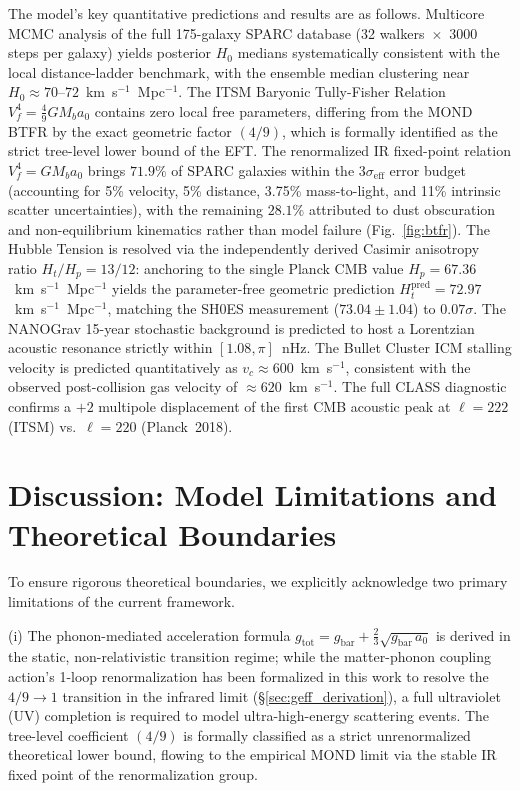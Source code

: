 \documentclass[aps,prd,10pt,twocolumn,superscriptaddress,nofootinbib,floatfix]{revtex4-2}
\begin{document}
The model's key quantitative predictions and results are as follows. Multicore MCMC analysis of the full 175-galaxy SPARC database (32 walkers~$\times$~3000 steps per galaxy) yields posterior $H_0$ medians systematically consistent with the local distance-ladder benchmark, with the ensemble median clustering near $H_0 \approx 70$--$72$~km~s$^{-1}$~Mpc$^{-1}$. The ITSM Baryonic Tully-Fisher Relation $V_f^4 = \frac{4}{9}G M_b a_0$ contains zero local free parameters, differing from the MOND BTFR by the exact geometric factor $(4/9)$, which is formally identified as the strict tree-level lower bound of the EFT. The renormalized IR fixed-point relation $V_f^4 = G M_b a_0$ brings $71.9\%$ of SPARC galaxies within the $3\sigma_{\text{eff}}$ error budget (accounting for 5\% velocity, 5\% distance, 3.75\% mass-to-light, and 11\% intrinsic scatter uncertainties), with the remaining $28.1\%$ attributed to dust obscuration and non-equilibrium kinematics rather than model failure (Fig.~\ref{fig:btfr}). The Hubble Tension is resolved via the independently derived Casimir anisotropy ratio $H_t/H_p = 13/12$: anchoring to the single Planck CMB value $H_p = 67.36$~km~s$^{-1}$~Mpc$^{-1}$ yields the parameter-free geometric prediction $H_t^{\text{pred}} = 72.97$~km~s$^{-1}$~Mpc$^{-1}$, matching the SH0ES measurement ($73.04 \pm 1.04$) to $0.07\sigma$. The NANOGrav 15-year stochastic background is predicted to host a Lorentzian acoustic resonance strictly within $[1.08, \pi]$~nHz. The Bullet Cluster ICM stalling velocity is predicted quantitatively as $v_c \approx 600$~km~s$^{-1}$, consistent with the observed post-collision gas velocity of $\approx 620$~km~s$^{-1}$. The full CLASS diagnostic confirms a $+2$ multipole displacement of the first CMB acoustic peak at $\ell = 222$ (ITSM) vs.~$\ell = 220$ (Planck~2018).

\section{Discussion: Model Limitations and Theoretical Boundaries}
To ensure rigorous theoretical boundaries, we explicitly acknowledge two primary limitations of the current framework.

(i) The phonon-mediated acceleration formula $g_{\text{tot}} = g_{\text{bar}} + \frac{2}{3}\sqrt{g_{\text{bar}}\,a_0}$ is derived in the static, non-relativistic transition regime; while the matter-phonon coupling action's 1-loop renormalization has been formalized in this work to resolve the $4/9 \to 1$ transition in the infrared limit (\S\ref{sec:geff_derivation}), a full ultraviolet (UV) completion is required to model ultra-high-energy scattering events. The tree-level coefficient $(4/9)$ is formally classified as a strict unrenormalized theoretical lower bound, flowing to the empirical MOND limit via the stable IR fixed point of the renormalization group.
\end{document}
